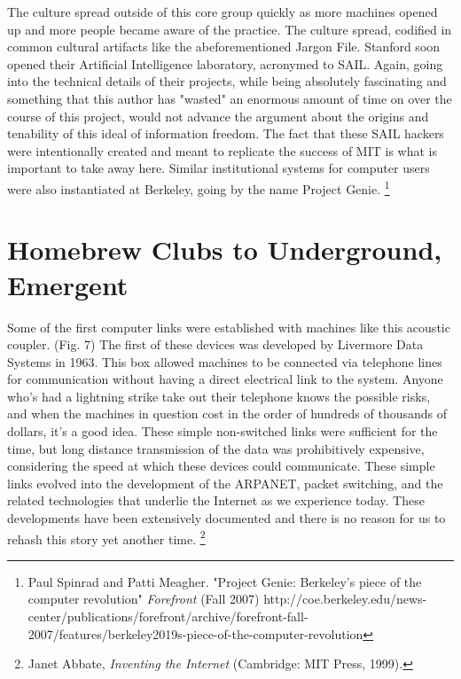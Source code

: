\documentclass[11pt]{article}
\begin{document}
The culture spread outside of this core group quickly as more machines opened up and more people became aware of the practice. The culture spread, codified in common cultural artifacts like the abeforementioned Jargon File. Stanford soon opened their Artificial Intelligence laboratory, acronymed to SAIL. Again, going into the technical details of their projects, while being absolutely fascinating and something that this author has "wasted" an enormous amount of time on over the course of this project, would not advance the argument about the origins and tenability of this ideal of information freedom. The fact that these SAIL hackers were intentionally created and meant to replicate the success of MIT is what is important to take away here. Similar institutional systems for computer users were also instantiated at Berkeley, going by the name Project Genie.
\footnote{Paul Spinrad and Patti Meagher. "Project Genie: Berkeley’s piece of the computer revolution" \emph{Forefront} (Fall 2007) http://coe.berkeley.edu/news-center/publications/forefront/archive/forefront-fall-2007/features/berkeley2019s-piece-of-the-computer-revolution}

\newpage
\section{Homebrew Clubs to Underground, Emergent}

Some of the first computer links were established with machines like this acoustic coupler. (Fig. 7) The first of these devices was developed by Livermore Data Systems in 1963. This box allowed machines to be connected via telephone lines for communication without having a direct electrical link to the system. Anyone who's had a lightning strike take out their telephone knows the possible risks, and when the machines in question cost in the order of hundreds of thousands of dollars, it's a good idea. These simple non-switched links were sufficient for the time, but long distance transmission of the data was prohibitively expensive, considering the speed at which these devices could communicate. These simple links evolved into the development of the ARPANET, packet switching, and the related technologies that underlie the Internet as we experience today. These developments have been extensively documented and there is no reason for us to rehash this story yet another time.
\footnote{Janet Abbate, \emph{Inventing the Internet} (Cambridge: MIT Press, 1999).}
\end{document}
